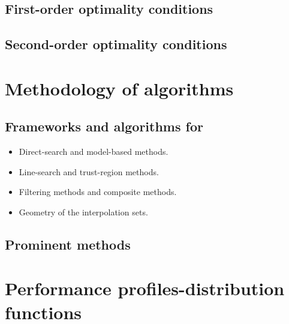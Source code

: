 \subsection{First-order optimality conditions}

\subsection{Second-order optimality conditions}

\section{Methodology of  algorithms}

\subsection{Frameworks and algorithms for }

\begin{itemize}
    \item Direct-search and model-based methods.
    \item Line-search and trust-region methods.
    \item Filtering methods and composite methods.
    \item Geometry of the interpolation sets.
\end{itemize}

\subsection{Prominent  methods}

\section{Performance profiles-distribution functions}
